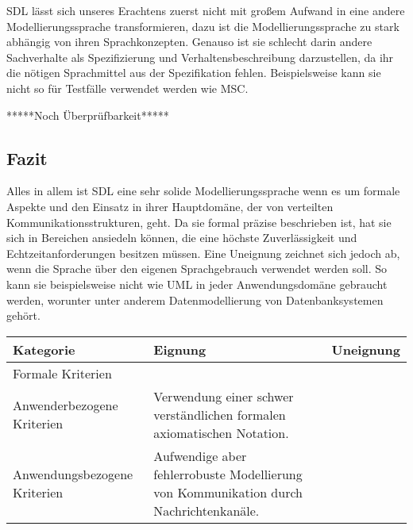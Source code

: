 \ac{SDL} lässt sich unseres Erachtens zuerst nicht mit großem Aufwand in eine andere Modellierungssprache transformieren, dazu ist die Modellierungssprache zu stark abhängig von ihren Sprachkonzepten. Genauso ist sie schlecht darin andere Sachverhalte als Spezifizierung und Verhaltensbeschreibung darzustellen, da ihr die nötigen Sprachmittel aus der Spezifikation fehlen. Beispielsweise kann sie nicht so für Testfälle verwendet werden wie \ac{MSC}.

*****Noch Überprüfbarkeit*****

\subsection{Fazit}
\label{scc:SDL_Fazit}
Alles in allem ist \ac{SDL} eine sehr solide Modellierungssprache wenn es um formale Aspekte und den Einsatz in ihrer Hauptdomäne, der von verteilten Kommunikationsstrukturen, geht. Da sie formal präzise beschrieben ist, hat sie sich in Bereichen ansiedeln können, die eine höchste Zuverlässigkeit und Echtzeitanforderungen besitzen müssen. Eine Uneignung zeichnet sich jedoch ab, wenn die Sprache über den eigenen Sprachgebrauch verwendet werden soll. So kann sie beispielsweise nicht wie \ac{UML} in jeder Anwendungsdomäne gebraucht werden, worunter unter anderem Datenmodellierung von Datenbanksystemen gehört.  

\begin{tabularx}{\textwidth}{|l|X|X|}
	\hline
	Kategorie & Eignung & Uneignung  \\
	\hline
	Formale Kriterien	& & \\
	\hline
	Anwenderbezogene Kriterien & Verwendung einer schwer verständlichen formalen axiomatischen Notation. & \\
	\hline
	Anwendungsbezogene Kriterien & Aufwendige aber fehlerrobuste	Modellierung von Kommunikation durch Nachrichtenkanäle. & \\
	\hline
\end{tabularx} 

